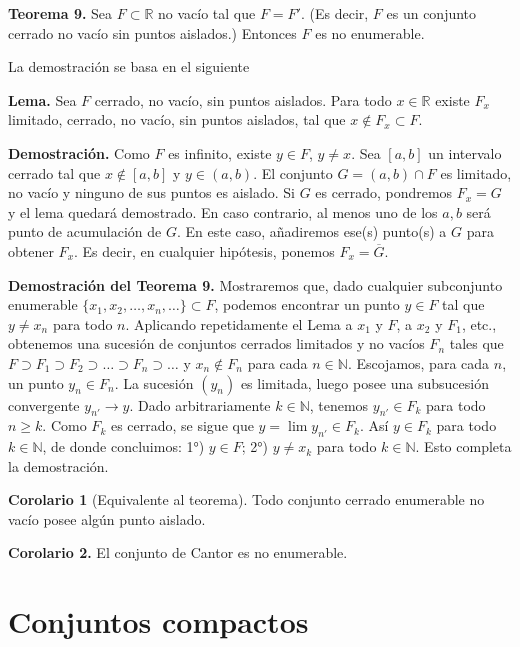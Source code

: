 \documentclass[12pt,oneside]{book}
\begin{document}
\textbf{Teorema 9.} Sea \(F \subset \mathbb{R}\) no vacío tal que \(F = F'\). (Es decir, \(F\) es un conjunto cerrado no vacío sin puntos aislados.) Entonces \(F\) es no enumerable.

La demostración se basa en el siguiente

\textbf{Lema.} Sea \(F\) cerrado, no vacío, sin puntos aislados. Para todo \(x \in \mathbb{R}\) existe \(F_x\) limitado, cerrado, no vacío, sin puntos aislados, tal que \(x \notin F_x \subset F\).

\textbf{Demostración.} Como \(F\) es infinito, existe \(y \in F\), \(y \neq x\). Sea \([a, b]\) un intervalo cerrado tal que \(x \notin [a, b]\) y \(y \in (a, b)\). El conjunto \(G = (a, b) \cap F\) es limitado, no vacío y ninguno de sus puntos es aislado. Si \(G\) es cerrado, pondremos \(F_x = G\) y el lema quedará demostrado. En caso contrario, al menos uno de los \(a, b\) será punto de acumulación de \(G\). En este caso, añadiremos ese(s) punto(s) a \(G\) para obtener \(F_x\). Es decir, en cualquier hipótesis, ponemos \(F_x = \overline{G}\).

\textbf{Demostración del Teorema 9.} Mostraremos que, dado cualquier subconjunto enumerable \(\{x_1, x_2, \dots, x_n, \dots\} \subset F\), podemos encontrar un punto \(y \in F\) tal que \(y \neq x_n\) para todo \(n\). Aplicando repetidamente el Lema a \(x_1\) y \(F\), a \(x_2\) y \(F_1\), etc., obtenemos una sucesión de conjuntos cerrados limitados y no vacíos \(F_n\) tales que \(F \supset F_1 \supset F_2 \supset \dots \supset F_n \supset \dots\) y \(x_n \notin F_n\) para cada \(n \in \mathbb{N}\). Escojamos, para cada \(n\), un punto \(y_n \in F_n\). La sucesión \((y_n)\) es limitada, luego posee una subsucesión convergente \(y_{n'} \to y\). Dado arbitrariamente \(k \in \mathbb{N}\), tenemos \(y_{n'} \in F_k\) para todo \(n \geq k\). Como \(F_k\) es cerrado, se sigue que \(y = \lim y_{n'} \in F_k\). Así \(y \in F_k\) para todo \(k \in \mathbb{N}\), de donde concluimos: 1°) \(y \in F\); 2°) \(y \neq x_k\) para todo \(k \in \mathbb{N}\). Esto completa la demostración.

\textbf{Corolario 1} (Equivalente al teorema). Todo conjunto cerrado enumerable no vacío posee algún punto aislado.

\textbf{Corolario 2.} El conjunto de Cantor es no enumerable.

\section{Conjuntos compactos}
\end{document}
